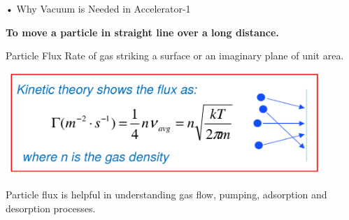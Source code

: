 \documentclass[11]{beamer}
\begin{document}
\begin{frame}{• Why Vacuum is Needed in Accelerator-1}
\begin{center}

\end{center}

		
\textbf{To move a particle in straight line over a long distance.}

\end{frame}







\begin{frame}{Particle Flux}
Rate of gas striking a surface or an imaginary plane of unit area.
    \begin{center}
   			\includegraphics[width=0.9\textwidth]{ParticleFlux.png}
  	 \end{center}

\begin{exampleblock}{}
Particle flux is helpful in understanding gas flow, pumping, adsorption and desorption processes.
\end{exampleblock}


\end{frame}
\end{document}
